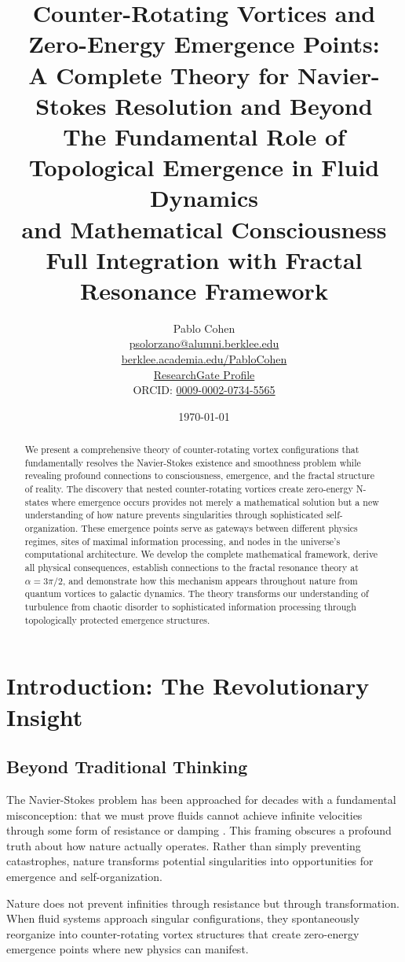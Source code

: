 \documentclass[12pt]{article}
\title{\textbf{Counter-Rotating Vortices and Zero-Energy Emergence Points:\\
A Complete Theory for Navier-Stokes Resolution and Beyond}\\[0.5cm]
\Large The Fundamental Role of Topological Emergence in Fluid Dynamics\\
and Mathematical Consciousness\\[0.3cm]
\large Full Integration with Fractal Resonance Framework}
\author{Pablo Cohen\\
\href{mailto:psolorzano@alumni.berklee.edu}{psolorzano@alumni.berklee.edu}\\
\href{https://berklee.academia.edu/PabloCohen}{berklee.academia.edu/PabloCohen}\\
\href{https://www.researchgate.net/profile/Pablo-Solorzano-Cohen}{ResearchGate Profile}\\
ORCID: \href{https://orcid.org/0009-0002-0734-5565}{0009-0002-0734-5565}}
\date{\today}
\begin{document}
\maketitle

\begin{abstract}
We present a comprehensive theory of counter-rotating vortex configurations that fundamentally resolves the Navier-Stokes existence and smoothness problem while revealing profound connections to consciousness, emergence, and the fractal structure of reality. The discovery that nested counter-rotating vortices create zero-energy N-states where emergence occurs provides not merely a mathematical solution but a new understanding of how nature prevents singularities through sophisticated self-organization. These emergence points serve as gateways between different physics regimes, sites of maximal information processing, and nodes in the universe's computational architecture. We develop the complete mathematical framework, derive all physical consequences, establish connections to the fractal resonance theory at $\alpha = 3\pi/2$, and demonstrate how this mechanism appears throughout nature from quantum vortices to galactic dynamics. The theory transforms our understanding of turbulence from chaotic disorder to sophisticated information processing through topologically protected emergence structures.
\end{abstract}

\tableofcontents
\pagebreak

\section{Introduction: The Revolutionary Insight}

\subsection{Beyond Traditional Thinking}

The Navier-Stokes problem has been approached for decades with a fundamental misconception: that we must prove fluids cannot achieve infinite velocities through some form of resistance or damping \cite{fefferman2000,temam2001}. This framing obscures a profound truth about how nature actually operates. Rather than simply preventing catastrophes, nature transforms potential singularities into opportunities for emergence and self-organization.

\begin{keyinsight}
Nature does not prevent infinities through resistance but through transformation. When fluid systems approach singular configurations, they spontaneously reorganize into counter-rotating vortex structures that create zero-energy emergence points where new physics can manifest.
\end{keyinsight}
\end{document}
